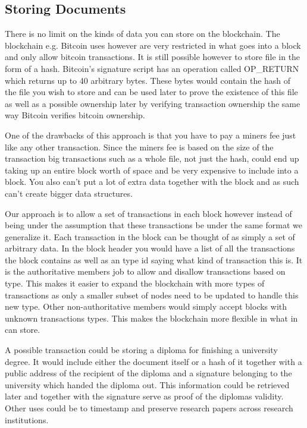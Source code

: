 \documentclass[11pt]{article}
\begin{document}
\subsection{Storing Documents}

There is no limit on the kinds of data you can store on the blockchain. The blockchain e.g. Bitcoin uses however are very restricted in what goes into a block and only allow bitcoin transactions. It is still possible however to store file in the form of a hash. Bitcoin's signature script has an operation called OP\_RETURN which returns up to 40 arbitrary bytes. These bytes would contain the hash of the file you wish to store and can be used later to prove the existence of this file as well as a possible ownership later by verifying transaction ownership the same way Bitcoin verifies bitcoin ownership.

One of the drawbacks of this approach is that you have to pay a miners fee just like any other transaction. Since the miners fee is based on the size of the transaction big transactions such as a whole file, not just the hash, could end up taking up an entire block worth of space and be very expensive to include into a block. You also can't put a lot of extra data together with the block and as such can't create bigger data structures.

Our approach is to allow a set of transactions in each block however instead of being under the assumption that these transactions be under the same format we generalize it. Each transaction in the block can be thought of as simply a set of arbitrary data. In the block header you would have a list of all the transactions the block contains as well as an type id saying what kind of transaction this is. It is the authoritative members job to allow and disallow transactions based on type. This makes it easier to expand the blockchain with more types of transactions as only a smaller subset of nodes need to be updated to handle this new type. Other non-authoritative members would simply accept blocks with unknown transactions types. This makes the blockchain more flexible in what in can store.


A possible transaction could be storing a diploma for finishing a university degree. It would include either the document itself or a hash of it together with a public address of the recipient of the diploma and a signature belonging to the university which handed the diploma out. This information could be retrieved later and together with the signature serve as proof of the diplomas validity. Other uses could be to timestamp and preserve research papers across research institutions. 




\newpage
 

\end{document}
